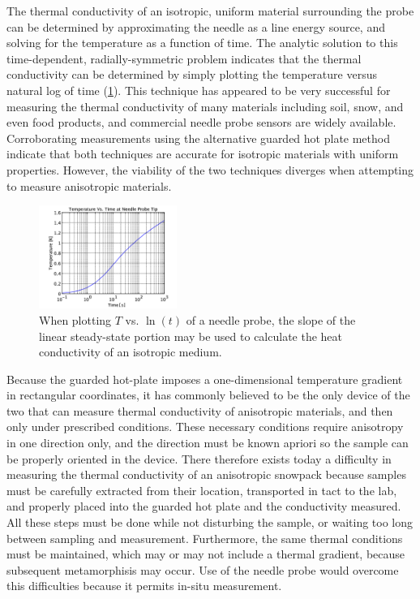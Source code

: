\documentclass[12pt, letterpaper]{article}
\begin{document}
The thermal conductivity of an isotropic, uniform material surrounding the probe can be determined by approximating the needle as a line energy source, and solving for the temperature as a function of time. The analytic solution to this time-dependent, radially-symmetric problem indicates that the thermal conductivity can be determined by simply plotting the temperature versus natural log of time (\ref{fig:log_graph}).
This technique has appeared to be very successful for measuring the thermal conductivity of many materials including soil, snow, and even food products, and commercial needle probe sensors are widely available. Corroborating measurements using the alternative guarded hot plate method indicate that both techniques are accurate for isotropic materials with uniform properties. However, the viability of the two techniques diverges when attempting to measure anisotropic materials.

\begin{figure}
\centering
\label{fig:log_graph}
\includegraphics[width=0.4\textwidth]{lolg_scale}
\caption{When plotting \(T\) vs. \(\ln(t)\) of a needle probe, the slope of the linear steady-state portion may be used to calculate the heat conductivity of an isotropic medium.}
\end{figure}

Because the guarded hot-plate imposes a one-dimensional temperature gradient in rectangular coordinates, it has commonly believed to be the only device of the two that can measure thermal conductivity of anisotropic materials, and then only under prescribed conditions. These necessary conditions require anisotropy in one direction only, and the direction must be known apriori so the sample can be properly oriented in the device.
There therefore exists today a difficulty in measuring the thermal conductivity of an anisotropic snowpack because samples must be carefully extracted from their location, transported in tact to the lab, and properly placed into the guarded hot plate and the conductivity measured. All these steps must be done while not disturbing the sample, or waiting too long between sampling and measurement. Furthermore, the same thermal conditions must be maintained, which may or may not include a thermal gradient, because subsequent metamorphisis may occur. Use of the needle probe would overcome this difficulties because it permits in-situ measurement.
\end{document}

